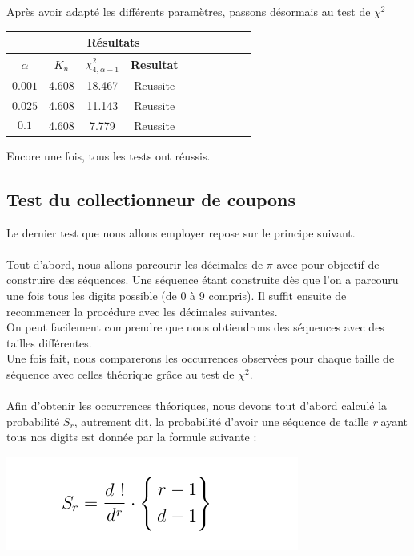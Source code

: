 \documentclass[french]{article}
\begin{document}
Après avoir adapté les différents paramètres, passons désormais au test de $\chi^{2}$
\begin{longtable}{|c|c|c|c|c|c|c|c|c|c|}
	\hline
	& \multicolumn{3}{c|}{\textbf{Résultats}} \\ 
	\hline 
	\textbf{$\alpha$}  & $K_{n}$ & $\chi^{2}_{4,\alpha-1}$ & \textbf{Resultat} \\ 
	\hline 
	$$0.001$$ & 4.608 & 18.467 & Reussite\\ 
	\hline 
	$$0.025$$ & 4.608 & 11.143 & Reussite\\ 
	\hline 
	$$0.1$$ & 4.608 & 7.779 & Reussite \\ 
	\hline 
\end{longtable}

Encore une fois, tous les tests ont réussis.
\\
\subsection{Test du collectionneur de coupons}
\label{testcoll}
Le dernier test que nous allons employer repose sur le principe suivant. 
\\
\\
Tout d'abord, nous allons parcourir les décimales de $\pi$ avec pour objectif de construire des séquences.
Une séquence étant construite dès que l'on a parcouru une fois tous les digits possible (de 0 à 9 compris).
Il suffit ensuite de recommencer la procédure avec les décimales suivantes.
\\
On peut facilement comprendre que nous obtiendrons des séquences avec des tailles différentes.
\\
Une fois fait, nous comparerons les occurrences observées pour chaque taille de séquence avec celles théorique grâce au test de \textbf{$\chi^{2}$}.
\\
\\
Afin d'obtenir les occurrences théoriques, nous devons tout d'abord calculé la probabilité $S_{r}$, autrement dit, la probabilité d'avoir une séquence de taille \textit{r} ayant tous nos digits est donnée par la formule suivante :

	\begin{center}
		\includegraphics[scale=0.40]{Archives/Images/coupons}
	\end{center}
\end{document}
